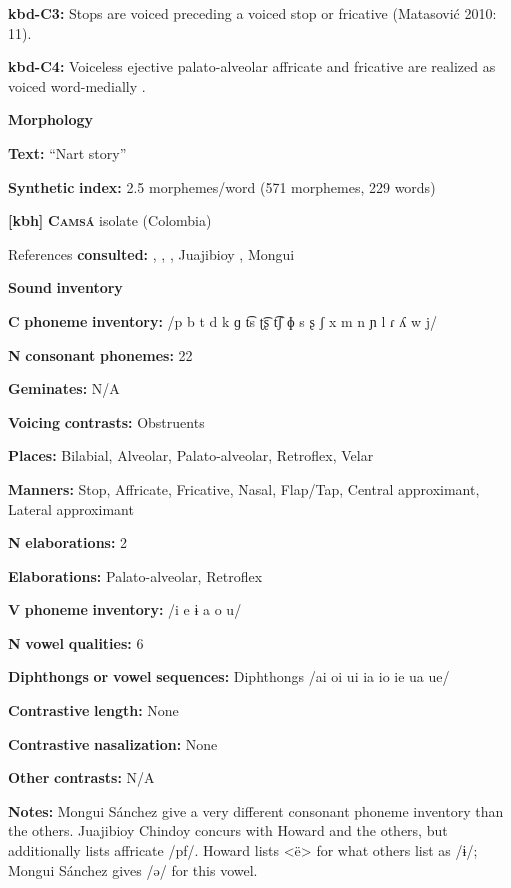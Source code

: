 \textbf{kbd-C3:} Stops are voiced preceding a voiced stop or fricative (Matasović 2010: 11).

\textbf{kbd-C4:} Voiceless ejective palato-alveolar affricate and fricative are realized as voiced word-medially \citep[19]{Kuipers1960}.

\textbf{Morphology}

\textbf{Text:} “Nart story” \citep[223-231]{Applebaum2013}

\textbf{Synthetic} \textbf{index:} 2.5 morphemes/word (571 morphemes, 229 words)

\textbf{[kbh]}   \textbf{\textsc{Camsá}}  isolate (Colombia)

References \textbf{consulted:} \citet{Fabre2002}, \citet{Howard1967}, \citet{Howard1972}, Juajibioy \citet{Chindoy1962}, Mongui \citet{Sánchez1981}

\textbf{Sound} \textbf{inventory}

\textbf{C} \textbf{phoneme} \textbf{inventory:} /p b t d k ɡ t͡s ʈ͡ʂ t͡ʃ ɸ s ʂ ʃ x m n ɲ l ɾ ʎ w j/

\textbf{N} \textbf{consonant} \textbf{phonemes:} 22

\textbf{Geminates:} N/A

\textbf{Voicing} \textbf{contrasts:} Obstruents

\textbf{Places:} Bilabial, Alveolar, Palato-alveolar, Retroflex, Velar

\textbf{Manners:} Stop, Affricate, Fricative, Nasal, Flap/Tap, Central approximant, Lateral approximant

\textbf{N} \textbf{elaborations:} 2

\textbf{Elaborations:} Palato-alveolar, Retroflex

\textbf{V} \textbf{phoneme} \textbf{inventory:} /i e ɨ a o u/

\textbf{N} \textbf{vowel} \textbf{qualities:} 6

\textbf{Diphthongs} \textbf{or} \textbf{vowel} \textbf{sequences:} Diphthongs /ai oi ui ia io ie ua ue/

\textbf{Contrastive} \textbf{length:} None

\textbf{Contrastive} \textbf{nasalization:} None

\textbf{Other} \textbf{contrasts:} N/A

\textbf{Notes:} Mongui Sánchez give a very different consonant phoneme inventory than the others. Juajibioy Chindoy concurs with Howard and the others, but additionally lists affricate /pf/. Howard lists <ë> for what others list as /ɨ/; Mongui Sánchez gives /ə/ for this vowel.

